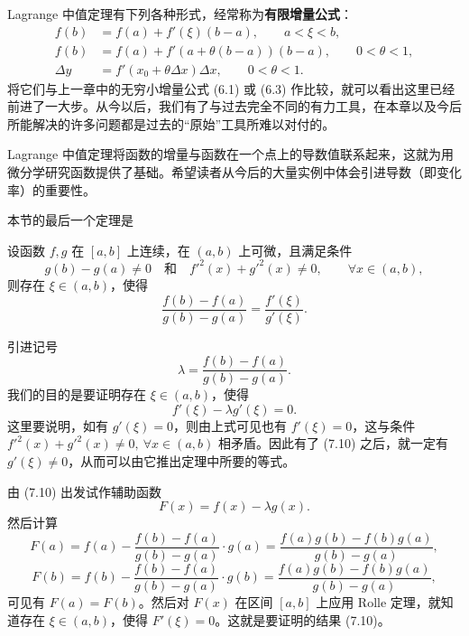 \begin{xremark}
Lagrange 中值定理有下列各种形式，经常称为\textbf{有限增量公式}：
\begin{align}
  f(b)&=f(a)+f'(\xi)(b-a),\qquad a<\xi<b, \tag{7.7}\\
  f(b)&=f(a)+f'(a+\theta(b-a))(b-a),\qquad 0<\theta<1, \tag{7.8}\\
  \Delta y&=f'(x_0+\theta\Delta x)\Delta x,\qquad 0<\theta<1. \tag{7.9}
\end{align}
将它们与上一章中的无穷小增量公式 (6.1) 或 (6.3) 作比较，就可以看出这里已经前进了一大步。从今以后，我们有了与过去完全不同的有力工具，在本章以及今后所能解决的许多问题都是过去的“原始”工具所难以对付的。
\end{xremark}

\begin{xremark}
Lagrange 中值定理将函数的增量与函数在一个点上的导数值联系起来，这就为用微分学研究函数提供了基础。希望读者从今后的大量实例中体会引进导数（即变化率）的重要性。
\end{xremark}

本节的最后一个定理是

\begin{xproposition}
设函数 $f,g$ 在 $[a,b]$ 上连续，在 $(a,b)$ 上可微，且满足条件
\[
  g(b)-g(a)\neq0\quad\text{和}\quad f'^2(x)+g'^2(x)\neq0,\qquad \forall x\in(a,b),
\]
则存在 $\xi\in(a,b)$，使得
\[
  \frac{f(b)-f(a)}{g(b)-g(a)}=\frac{f'(\xi)}{g'(\xi)}.
\]
\end{xproposition}

\begin{xproof}
引进记号
\[
  \lambda=\frac{f(b)-f(a)}{g(b)-g(a)}.
\]
我们的目的是要证明存在 $\xi\in(a,b)$，使得
\begin{equation}
  f'(\xi)-\lambda g'(\xi)=0.
  \tag{7.10}
\end{equation}
这里要说明，如有 $g'(\xi)=0$，则由上式可见也有 $f'(\xi)=0$，这与条件 $f'^2(x)+g'^2(x)\neq0,\ \forall x\in(a,b)$ 相矛盾。因此有了 (7.10) 之后，就一定有 $g'(\xi)\neq0$，从而可以由它推出定理中所要的等式。

由 (7.10) 出发试作辅助函数
\[
  F(x)=f(x)-\lambda g(x).
\]
然后计算
\[
  F(a)=f(a)-\frac{f(b)-f(a)}{g(b)-g(a)}\cdot g(a)
      =\frac{f(a)g(b)-f(b)g(a)}{g(b)-g(a)},
\]
\[
  F(b)=f(b)-\frac{f(b)-f(a)}{g(b)-g(a)}\cdot g(b)
      =\frac{f(a)g(b)-f(b)g(a)}{g(b)-g(a)},
\]
可见有 $F(a)=F(b)$。然后对 $F(x)$ 在区间 $[a,b]$ 上应用 Rolle 定理，就知道存在 $\xi\in(a,b)$，使得 $F'(\xi)=0$。这就是要证明的结果 (7.10)。
\end{xproof}

